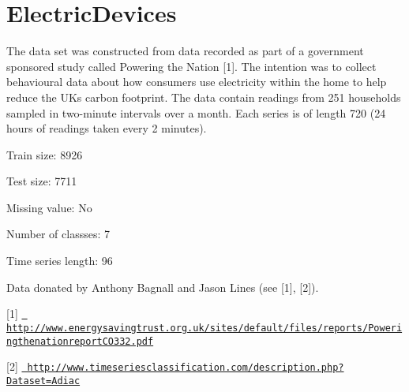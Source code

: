 \chapter{Electric\+Devices}
\hypertarget{md_external_2data_2UCRArchive__2018_2ElectricDevices_2README}{}\label{md_external_2data_2UCRArchive__2018_2ElectricDevices_2README}
\label{md_external_2data_2UCRArchive__2018_2ElectricDevices_2README_autotoc_md61}%
%
 The data set was constructed from data recorded as part of a government sponsored study called Powering the Nation \mbox{[}1\mbox{]}. The intention was to collect behavioural data about how consumers use electricity within the home to help reduce the UK\textquotesingle{}s carbon footprint. The data contain readings from 251 households sampled in two-\/minute intervals over a month. Each series is of length 720 (24 hours of readings taken every 2 minutes).

Train size\+: 8926

Test size\+: 7711

Missing value\+: No

Number of classses\+: 7

Time series length\+: 96

Data donated by Anthony Bagnall and Jason Lines (see \mbox{[}1\mbox{]}, \mbox{[}2\mbox{]}).

\mbox{[}1\mbox{]} \href{http://www.energysavingtrust.org.uk/sites/default/files/reports/PoweringthenationreportCO332.pdf}{\texttt{ http\+://www.\+energysavingtrust.\+org.\+uk/sites/default/files/reports/\+Poweringthenationreport\+CO332.\+pdf}}

\mbox{[}2\mbox{]} \href{http://www.timeseriesclassification.com/description.php?Dataset=Adiac}{\texttt{ http\+://www.\+timeseriesclassification.\+com/description.\+php?\+Dataset=\+Adiac}} 